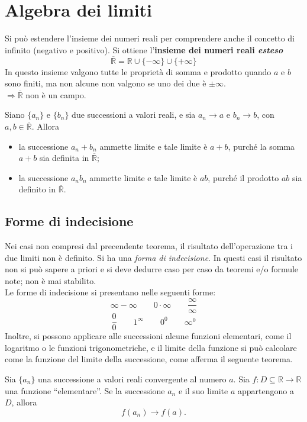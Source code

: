 \documentclass[a4paper,12pt, oneside]{book}
\begin{document}
\section{Algebra dei limiti}
\begin{shaded}
Si può estendere l'insieme dei numeri reali per comprendere anche il concetto di infinito (negativo e positivo). Si ottiene l'\textbf{insieme dei numeri reali \emph{esteso}} $$\overline{\mathbb{R}}=\mathbb{R}\cup\{-\infty\}\cup\{+\infty\}$$In questo insieme valgono tutte le proprietà di somma e prodotto quando $a$ e $b$ sono finiti, ma non alcune non valgono se uno dei due è $\pm\infty$.\\$\Rightarrow\overline{\mathbb{R}}$ non è un campo.
\end{shaded}
\begin{teorema}
Siano $\{a_n\}$ e $\{b_n\}$ due successioni a valori reali, e sia $a_n\to a$ e $b_n\to b$, con $a,b\in\overline{\mathbb{R}}$. Allora
\begin{itemize}
	\item la successione $a_n+b_n$ ammette limite e tale limite è $a+b$, purché la somma $a+b$ sia definita in $\overline{\mathbb{R}}$;
	\item la successione $a_nb_n$ ammette limite e tale limite è $ab$, purché il prodotto $ab$ sia definito in $\overline{\mathbb{R}}$.
\end{itemize}
\end{teorema}
\subsection{Forme di indecisione}
Nei casi non compresi dal precendente teorema, il risultato dell'operazione tra i due limiti non è definito. Si ha una \textit{forma di indecisione}. In questi casi il risultato non si può sapere a priori e si deve dedurre caso per caso da teoremi e/o formule note; non è mai stabilito.\\
Le forme di indecisione si presentano nelle seguenti forme:
$$\infty-\infty\qquad 0\cdot\infty\qquad\frac{\infty}{\infty}$$
$$\frac00\qquad 1^\infty\qquad 0^0\qquad \infty^0$$
Inoltre, si possono applicare alle successioni alcune funzioni elementari, come il logaritmo o le funzioni trigonometriche, e il limite della funzione si può calcolare come la funzione del limite della successione, come afferma il seguente teorema.
\begin{teorema}
Sia $\{a_n\}$ una successione a valori reali convergente al numero $a$. Sia $f\colon D\subseteq\mathbb{R}\to\mathbb{R}$ una funzione ``elementare''. Se la successione $a_n$ e il suo limite $a$ appartengono a $D$, allora
\[
f(a_n)\to f(a).
\]
\end{teorema}
\end{document}
